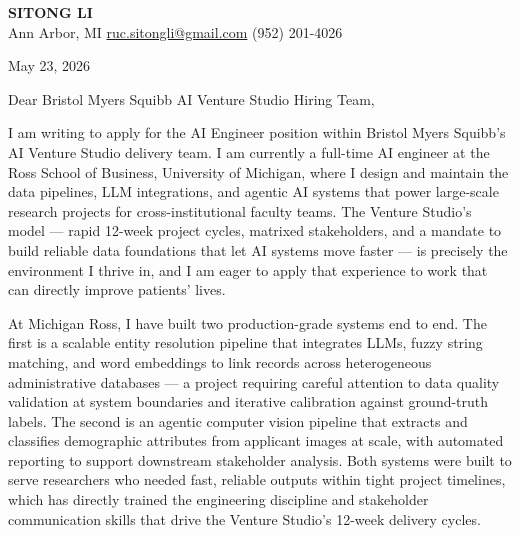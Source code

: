 \documentclass[12pt]{article}
\begin{document}
\begin{center}
  {\LARGE\textbf{\textcolor{accent}{SITONG LI}}} \\[4pt]
  \small Ann Arbor, MI
  \;\textbullet\;
  \href{mailto:ruc.sitongli@gmail.com}{ruc.sitongli@gmail.com}
  \;\textbullet\;
  (952) 201-4026
\end{center}

\vspace{1em}

\noindent May 23, 2026

\vspace{1em}

\noindent Dear Bristol Myers Squibb AI Venture Studio Hiring Team,

\vspace{1em}

I am writing to apply for the AI Engineer position within Bristol Myers Squibb's AI Venture Studio delivery team. I am currently a full-time AI engineer at the Ross School of Business, University of Michigan, where I design and maintain the data pipelines, LLM integrations, and agentic AI systems that power large-scale research projects for cross-institutional faculty teams. The Venture Studio's model --- rapid 12-week project cycles, matrixed stakeholders, and a mandate to build reliable data foundations that let AI systems move faster --- is precisely the environment I thrive in, and I am eager to apply that experience to work that can directly improve patients' lives.

At Michigan Ross, I have built two production-grade systems end to end. The first is a scalable entity resolution pipeline that integrates LLMs, fuzzy string matching, and word embeddings to link records across heterogeneous administrative databases --- a project requiring careful attention to data quality validation at system boundaries and iterative calibration against ground-truth labels. The second is an agentic computer vision pipeline that extracts and classifies demographic attributes from applicant images at scale, with automated reporting to support downstream stakeholder analysis. Both systems were built to serve researchers who needed fast, reliable outputs within tight project timelines, which has directly trained the engineering discipline and stakeholder communication skills that drive the Venture Studio's 12-week delivery cycles.
\end{document}
